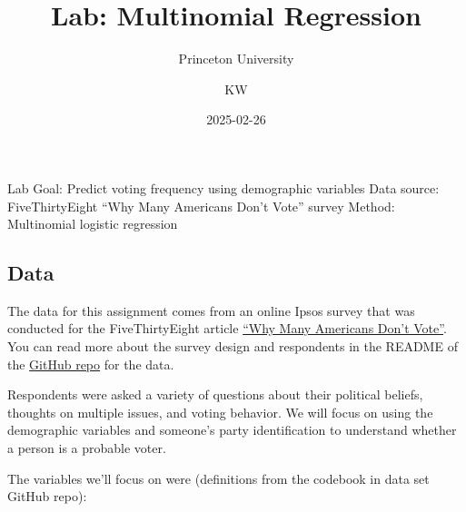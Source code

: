 \documentclass[
  letterpaper,
  DIV=11,
  numbers=noendperiod]{scrartcl}
\title{Lab: Multinomial Regression}
\subtitle{Princeton University}
\author{KW}
\date{2025-02-26}
\begin{document}
\maketitle

Lab Goal: Predict voting frequency using demographic variables Data
source: FiveThirtyEight ``Why Many Americans Don't Vote'' survey Method:
Multinomial logistic regression

\subsection{Data}\label{data}

The data for this assignment comes from an online Ipsos survey that was
conducted for the FiveThirtyEight article
\href{https://projects.fivethirtyeight.com/non-voters-poll-2020-election/}{``Why
Many Americans Don't Vote''}. You can read more about the survey design
and respondents in the README of the
\href{https://github.com/fivethirtyeight/data/tree/master/non-voters}{GitHub
repo} for the data.

Respondents were asked a variety of questions about their political
beliefs, thoughts on multiple issues, and voting behavior. We will focus
on using the demographic variables and someone's party identification to
understand whether a person is a probable voter.

The variables we'll focus on were (definitions from the codebook in data
set GitHub repo):
\end{document}
